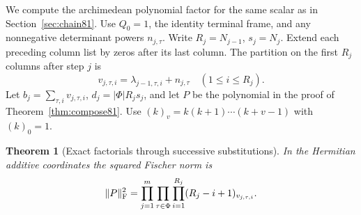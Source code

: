 \documentclass[a4paper,11pt]{article}
\newtheorem{theorem}[proposition]{Theorem}
\theoremstyle{definition}
\theoremstyle{remark}
\numberwithin{equation}{section}
\begin{document}
We compute the archimedean polynomial factor for the same scalar
as in Section~\ref{sec:chain81}. Use \(Q_0=1\), the identity
terminal frame, and any nonnegative determinant powers \(n_{j,\tau}\).
Write \(R_j=N_{j-1}\), \(s_j=N_j\). Extend each preceding column
list by zeros after its last column. The partition on the first
\(R_j\) columns after step \(j\) is
\[
 v_{j,\tau,i}=\lambda_{j-1,\tau,i}+n_{j,\tau}
       \quad(1\le i\le R_j).
\]
Let \(b_j=\sum_{\tau,i}v_{j,\tau,i}\), \(d_j=|\Phi|R_js_j\), and
let \(P\) be the polynomial in the proof of Theorem~\ref{thm:compose81}.
Use \((k)_v=k(k+1)\cdots(k+v-1)\) with \((k)_0=1\).

\begin{theorem}[Exact factorials through successive substitutions]
\label{thm:factor83}
In the Hermitian additive coordinates the squared Fischer norm is
\begin{equation}
 \|P\|_{\rm F}^2=
     \prod_{j=1}^m\prod_{\tau\in\Phi}
                   \prod_{i=1}^{R_j}(R_j-i+1)_{v_{j,\tau,i}} .
                                                        \label{eq:factor83}
\end{equation}
\end{theorem}
\end{document}
